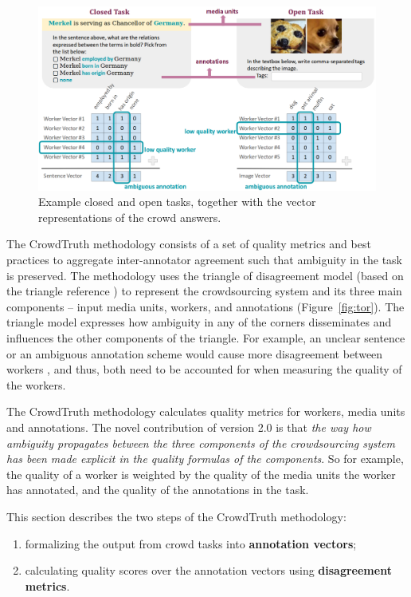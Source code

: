 \begin{figure}[!tb]
 	\centering
 	\includegraphics[width=0.8\linewidth]{img/closed_open_task.png}
 	\caption{Example closed and open tasks, together with the vector representations of the crowd answers.}
 	\label{fig:tasks}
 \end{figure}

The CrowdTruth methodology consists of a set of quality metrics and best practices to aggregate inter-annotator agreement such that ambiguity in the task is preserved. The methodology uses the triangle of disagreement model (based on the triangle reference \cite{knowlton1966definition}) to represent the crowdsourcing system and its three main components -- input media units, workers, and annotations (Figure~\ref{fig:tor}). The triangle model expresses how ambiguity in any of the corners disseminates and influences the other components of the triangle. For example, an unclear sentence or an ambiguous annotation scheme would cause more disagreement between workers \cite{aroyo2014threesides}, and thus, both need to be accounted for when measuring the quality of the workers.

The CrowdTruth methodology calculates quality metrics for workers, media units and annotations. The novel contribution of version 2.0 is that \textit{the way how ambiguity propagates between the three components of the crowdsourcing system has been made explicit in the quality formulas of the components}. So for example, the quality of a worker is weighted by the quality of the media units the worker has annotated, and the quality of the annotations in the task.

This section describes the two steps of the CrowdTruth methodology:
\begin{enumerate}
\item formalizing the output from crowd tasks into \textbf{annotation vectors};
\item calculating quality scores over the annotation vectors using \textbf{disagreement metrics}.
\end{enumerate}

